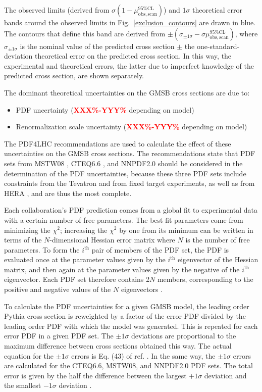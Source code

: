 \documentclass[dissertation.tex]{subfiles}
\begin{document}
The observed limits (derived from $\sigma(1 - \mu_{\mathrm{obs,scan}}^{95\%\mathrm{CL}})$) and $1\sigma$ theoretical error bands around the observed limits in Fig.~\ref{exclusion_contours} are drawn in blue.  The contours that define this band are derived from $\pm(\sigma_{\pm1\sigma} - \sigma\mu_{\mathrm{obs,scan}}^{95\%\mathrm{CL}})$, where $\sigma_{\pm1\sigma}$ is the nominal value of the predicted cross section $\pm$ the one-standard-deviation theoretical error on the predicted cross section.  In this way, the experimental and theoretical errors, the latter due to imperfect knowledge of the predicted cross section, are shown separately.

The dominant theoretical uncertainties on the GMSB cross sections are due to:

\begin{itemize}
\item PDF uncertainty (\textcolor{red}{\textbf{XXX\%-YYY\%}} depending on model)
\item Renormalization scale uncertainty (\textcolor{red}{\textbf{XXX\%-YYY\%}} depending on model)
\end{itemize}
%
The PDF4LHC \cite{PDF4LHC} recommendations are used to calculate the effect of these uncertainties on the GMSB cross sections.  The recommendations state that PDF sets from MSTW08 \cite{MSTW08}, CTEQ6.6 \cite{CTEQ6}, and NNPDF2.0 \cite{NNPDF2_0} should be considered in the determination of the PDF uncertainties, because these three PDF sets include constraints from the Tevatron and from fixed target experiments, as well as from HERA \cite{HERA}, and are thus the most complete.

Each collaboration's PDF prediction comes from a global fit to experimental data with a certain number of free parameters.  The best fit parameters come from minimizing the $\chi^{2}$; increasing the $\chi^{2}$ by one from its minimum can be written in terms of the $N$-dimensional Hessian error matrix \cite{Hessian} where $N$ is the number of free parameters.  To form the $i^{\mathrm{th}}$ pair of members of the PDF set, the PDF is evaluated once at the parameter values given by the $i^{\mathrm{th}}$ eigenvector of the Hessian matrix, and then again at the parameter values given by the negative of the $i^{\mathrm{th}}$ eigenvector.  Each PDF set therefore contains 2$N$ members, corresponding to the positive and negative values of the $N$ eigenvectors \cite{PDF_primer}.

To calculate the PDF uncertainties for a given GMSB model, the leading order Pythia cross section is reweighted by a factor of the error PDF divided by the leading order PDF with which the model was generated.  This is repeated for each error PDF in a given PDF set.  The $\pm1\sigma$ deviations are proportional to the maximum difference between cross sections obtained this way.  The actual equation for the $\pm1\sigma$ errors is Eq. (43) of ref. \cite{PDF_primer}.  In the same way, the $\pm1\sigma$ errors are calculated for the CTEQ6.6, MSTW08, and NNPDF2.0 PDF sets.  
The total error is given by the half the difference between the largest $+1\sigma$ deviation and the smallest $-1\sigma$ deviation \cite{PDF4LHC}.
\end{document}
